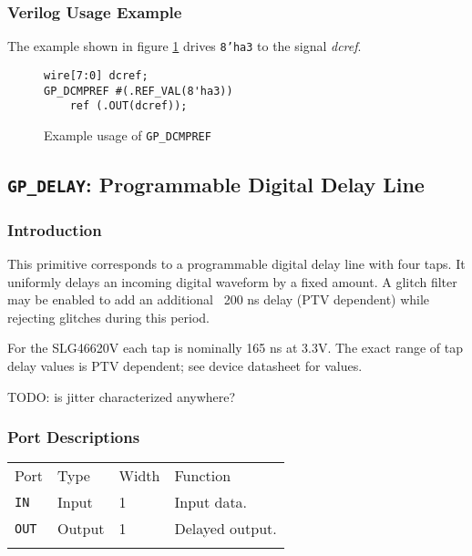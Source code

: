 \documentclass[11pt]{article}
\newcommand{\namestyle}[1]{\textit{#1}}
\newcommand{\tokenstyle}[1]{\texttt{#1}}
\newcommand{\datastyle}[1]{\texttt{#1}}
\newcommand{\whenstyle}[1]{{\fontseries{sb}\selectfont#1}}
\newcommand{\thinhline}{\Xhline{1\arrayrulewidth}}
\newcommand{\thickhline}{\Xhline{2.5\arrayrulewidth}}
\begin{document}
\subsubsection{Verilog Usage Example}

The example shown in figure \ref{gp-dcmpref-example} drives \datastyle{8'ha3} to the signal \namestyle{dcref}.

\begin{figure}[h]
\begin{lstlisting}
wire[7:0] dcref;
GP_DCMPREF #(.REF_VAL(8'ha3))
	ref (.OUT(dcref));
\end{lstlisting}
\caption{Example usage of \tokenstyle{GP\_DCMPREF}}
\label{gp-dcmpref-example}
\end{figure}


\pagebreak
\subsection{\tokenstyle{GP\_DELAY}: Programmable Digital Delay Line}
\label{gp-delay}

\subsubsection{Introduction}
This primitive corresponds to a programmable digital delay line with four taps. It uniformly delays an incoming digital
waveform by a fixed amount. A glitch filter may be enabled to add an additional ~200 ns delay (PTV dependent) while
rejecting glitches during this period.

For the SLG46620V each tap is nominally 165 ns at 3.3V. The exact range of tap delay values is PTV dependent; see
device datasheet for values.

TODO: is jitter characterized anywhere?

\subsubsection{Port Descriptions}

\begin{tabularx}{\textwidth}{lllX}
\thinhline
\whenstyle{Port} & \whenstyle{Type} & \whenstyle{Width} & \whenstyle{Function} \\
\thickhline
\tokenstyle{IN} & Input & 1 & Input data. \\
\thinhline
\tokenstyle{OUT} & Output & 1 & Delayed output. \\
\thinhline
\end{tabularx}
\end{document}
